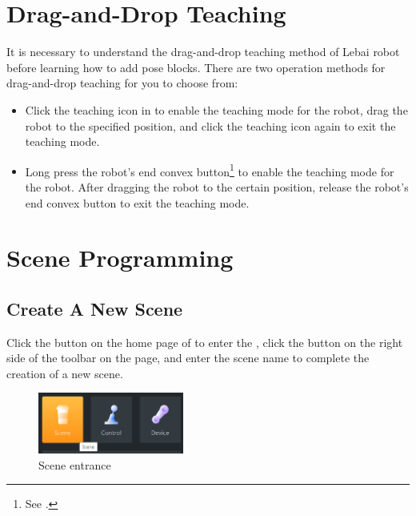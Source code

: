 \section{Drag-and-Drop Teaching}
It is necessary to understand the drag-and-drop teaching method of Lebai robot before learning how to add pose blocks. There are two operation methods for drag-and-drop teaching for you to choose from:
\begin{itemize}
	\item Click the teaching icon  in \LM to enable the teaching mode for the robot, drag the robot to the specified position, and click the teaching icon again to exit the teaching mode.
	\item Long press the robot's end convex button\footnote{See .} to enable the teaching mode for the robot. After dragging the robot to the certain position, release the robot's end convex button to exit the teaching mode.
\end{itemize}





\section{Scene Programming}
\subsection{Create A New Scene}
Click the  button on the home page of \LM to enter the , click the  button on the right side of the toolbar on the page, and enter the scene name to complete the creation of a new scene.

\begin{figure}[ht]
	\centering
	\includegraphics[height=2cm]{en/image/3-4.png}
	\caption{Scene entrance}
	\label{fig:场景入口}
\end{figure}

